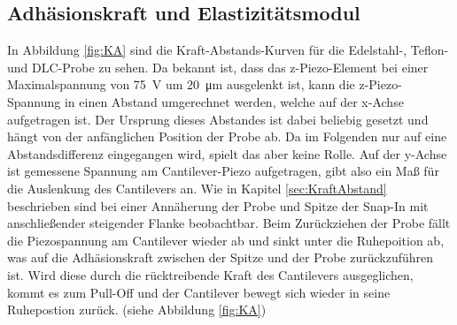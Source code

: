     \subsection{Adhäsionskraft und Elastizitätsmodul}
        In Abbildung \ref{fig:KA} sind die Kraft-Abstands-Kurven für die Edelstahl-, Teflon- und DLC-Probe zu sehen. Da bekannt ist, dass das z-Piezo-Element bei einer
        Maximalspannung von \SI{75}{\volt} um \SI{20}{\micro\metre} ausgelenkt ist, kann die z-Piezo-Spannung in einen Abstand umgerechnet werden, welche auf der x-Achse aufgetragen ist. Der Ursprung dieses Abstandes ist dabei beliebig gesetzt und hängt von der anfänglichen Position der Probe ab. Da im Folgenden nur auf eine Abstandsdifferenz eingegangen wird, spielt das aber keine Rolle. Auf der y-Achse ist gemessene Spannung am Cantilever-Piezo aufgetragen, gibt also ein Maß für die Auslenkung des Cantilevers an.
        Wie in Kapitel \ref{sec:KraftAbstand} beschrieben sind bei einer Annäherung der Probe und Spitze der Snap-In mit anschließender steigender Flanke beobachtbar. Beim Zurückziehen der Probe fällt die Piezospannung am Cantilever wieder ab und sinkt unter die Ruhepoition ab, was auf die Adhäsionskraft zwischen der Spitze und der Probe zurückzuführen ist. Wird diese durch die rücktreibende Kraft des Cantilevers ausgeglichen, kommt es zum Pull-Off und der Cantilever bewegt sich wieder in seine Ruhepostion zurück. (siehe Abbildung \ref{fig:KA})
